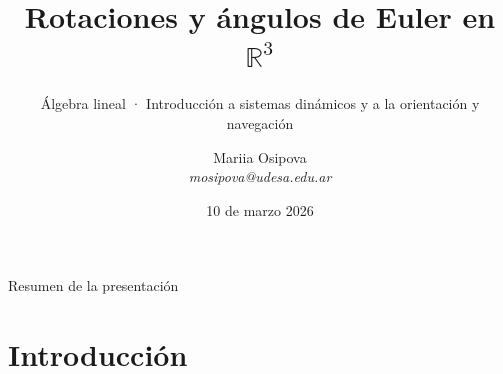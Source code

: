 \documentclass[11pt]{beamer}
\title{Rotaciones y ángulos de Euler en \(\mathbb{R}^3\)}
\subtitle{Álgebra lineal · Introducción a sistemas dinámicos y a la orientación y navegación}
\author[M. Osipova]{Mariia Osipova\\[3pt]\textit{mosipova@udesa.edu.ar}}
\institute{\\[12pt]Bajo la supervisión de Juan Felipe Perdomo}
\date[12 dic 2025]{10 de marzo 2026}
\begin{document}

\begin{frame}
	\titlepage %
\end{frame}



\begin{frame}{Resumen de la presentación}
  \tableofcontents
\end{frame}


\section{Introducción}

\end{document}

